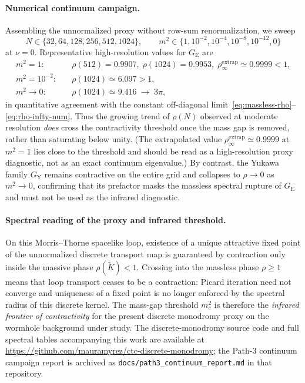 \documentclass{iopjournal}
\theoremstyle{remark}
\begin{document}
\paragraph{Numerical continuum campaign.}
Assembling the unnormalized proxy without row-sum renormalization, we sweep
\[
N\in\{32,64,128,256,512,1024\},
\qquad
m^{2}\in\{1,10^{-2},10^{-4},10^{-8},10^{-12},0\}
\]
at $\nu=0$.
Representative high-resolution values for $G_{\mathrm{E}}$ are
\begin{equation}
\label{eq:path3-numbers}
\begin{aligned}
m^{2}=1:&\quad
\rho(512)=0.9907,\;
\rho(1024)=0.9953,\;
\rho_{\infty}^{\mathrm{extrap}}\simeq 0.9999<1,\\[2pt]
m^{2}=10^{-2}:&\quad
\rho(1024)\simeq 6.097>1,\\[2pt]
m^{2}\to 0:&\quad
\rho(1024)\simeq 9.416
\;\to\;
3\pi,
\end{aligned}
\end{equation}
in quantitative agreement with the constant off-diagonal limit~\eqref{eq:massless-rho}--\eqref{eq:rho-infty-num}.
Thus the growing trend of $\rho(N)$ observed at moderate resolution \emph{does} cross the contractivity threshold once the mass gap is removed, rather than saturating below unity.
(The extrapolated value $\rho_{\infty}^{\mathrm{extrap}}\simeq 0.9999$ at $m^{2}=1$ lies close to the threshold and should be read as a high-resolution proxy diagnostic, not as an exact continuum eigenvalue.)
By contrast, the Yukawa family $G_{\mathrm{Y}}$ remains contractive on the entire grid and collapses to $\rho\to 0$ as $m^{2}\to 0$, confirming that its prefactor masks the massless spectral rupture of $G_{\mathrm{E}}$ and must not be used as the infrared diagnostic.

\paragraph{Spectral reading of the proxy and infrared threshold.}
On this Morris--Thorne spacelike loop, existence of a unique attractive fixed point of the unnormalized discrete transport map is guaranteed by contraction only inside the massive phase $\rho(\widetilde{K})<1$.
Crossing into the massless phase $\rho\ge 1$ means that loop transport ceases to be a contraction: Picard iteration need not converge and uniqueness of a fixed point is no longer enforced by the spectral radius of this discrete kernel.
The mass-gap threshold $m_{c}^{2}$ is therefore the \emph{infrared frontier of contractivity} for the present discrete monodromy proxy on the wormhole background under study.
The discrete-monodromy source code and full spectral tables accompanying this work are available at \url{https://github.com/mauramyrez/ctc-discrete-monodromy}; the Path-3 continuum campaign report is archived as \texttt{docs/path3\_continuum\_report.md} in that repository.
\end{document}

